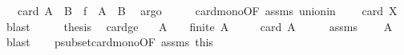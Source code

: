 \begin{isabellebody}
\ {\isachardoublequoteopen}{\isachardot}{\kern0pt}{\isachardot}{\kern0pt}{\isachardot}{\kern0pt}\ {\isacharequal}{\kern0pt}\ card\ {\isacharparenleft}{\kern0pt}{\isacharparenleft}{\kern0pt}A\ {\isasymunion}\ B{\isacharparenright}{\kern0pt}\ {\isasymunion}\ f\ {\isacharbackquote}{\kern0pt}\ {\isacharparenleft}{\kern0pt}A\ {\isasyminter}\ B{\isacharparenright}{\kern0pt}{\isacharparenright}{\kern0pt}{\isachardoublequoteclose}\ \isamarkupfalse%
\ argo\isanewline
\ \ \isamarkupfalse%
\ \isamarkupfalse%
\ card{\isacharunderscore}{\kern0pt}mono{\isacharbrackleft}{\kern0pt}OF\ assms{\isacharparenleft}{\kern0pt}{}{\isacharparenright}{\kern0pt}\ union{\isacharunderscore}{\kern0pt}in{\isacharbrackright}{\kern0pt}\ \isamarkupfalse%
\ {\isachardoublequoteopen}{\isachardot}{\kern0pt}{\isachardot}{\kern0pt}{\isachardot}{\kern0pt}\ {\isasymle}\ card\ X{\isachardoublequoteclose}\ \isamarkupfalse%
\ blast\isanewline
\ \ \isamarkupfalse%
\ \isamarkupfalse%
\ {\isacharquery}{\kern0pt}thesis\ \isacommand{{\isachardot}{\kern0pt}}\isamarkupfalse%
\isanewline
{}\isamarkupfalse%
%
\endisatagproof
{\isafoldproof}%
%
\isadelimproof
\isanewline
%
\endisadelimproof
\isanewline
{}\isamarkupfalse%
\ card{\isacharunderscore}{\kern0pt}ge{\isacharunderscore}{\kern0pt}{}{\isacharcolon}{\kern0pt}\isanewline
\ \ \ {\isachardoublequoteopen}A\ {\isasymnoteq}\ {\isacharbraceleft}{\kern0pt}{\isacharbraceright}{\kern0pt}{\isachardoublequoteclose}\ \ {\isachardoublequoteopen}finite\ A{\isachardoublequoteclose}\isanewline
\ \ \ {\isachardoublequoteopen}{}\ {\isacharless}{\kern0pt}\ card\ A{\isachardoublequoteclose}\isanewline
%
\isadelimproof
%
\endisadelimproof
%
\isatagproof
{}\isamarkupfalse%
\ {\isacharminus}{\kern0pt}\isanewline
\ \ \isamarkupfalse%
\ assms{\isacharparenleft}{\kern0pt}{}{\isacharparenright}{\kern0pt}\ \isamarkupfalse%
\ {\isachardoublequoteopen}{\isacharbraceleft}{\kern0pt}{\isacharbraceright}{\kern0pt}\ {\isasymsubset}\ A{\isachardoublequoteclose}\ \isamarkupfalse%
\ blast\isanewline
\ \ \isamarkupfalse%
\ psubset{\isacharunderscore}{\kern0pt}card{\isacharunderscore}{\kern0pt}mono{\isacharbrackleft}{\kern0pt}OF\ assms{\isacharparenleft}{\kern0pt}{}{\isacharparenright}{\kern0pt}\ this{\isacharbrackright}{\kern0pt}\ \isamarkupfalse%

\end{isabellebody}
